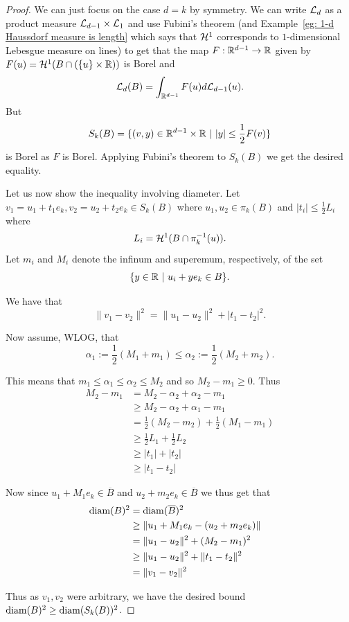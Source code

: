 \documentclass[twoside, a4paper, 10pt]{amsart}
\begin{document}
\begin{proof} We can just focus on the case $d=k$ by symmetry. We can write $\mathcal{L}_d$ as a product measure $\mathcal{L}_{d-1} \times \mathcal{L}_1$ and use Fubini's theorem (and Example~\ref{eg: 1-d Haussdorf measure is length} which says that $\mathcal{H}^1$ corresponds to $1$-dimensional Lebesgue measure on lines) to get that the map $F:\mathbb{R}^{d-1} \to \mathbb{R}$ given by $F(u) = \mathcal{H}^1(B \cap (\{u\} \times \mathbb{R}))$ is Borel and $$\mathcal{L}_d(B) = \int_{\mathbb{R}^{d-1}} F(u) d\mathcal{L}_{d-1}(u).$$ But $$S_k(B) = \{ (v, y) \in \mathbb{R}^{d-1} \times \mathbb{R} ~|~ |y| \leq \frac{1}{2} F(v) \}$$ is Borel as $F$ is Borel. Applying Fubini's theorem to $S_k(B)$ we get the desired equality.

Let us now show the inequality involving diameter. Let $v_1 = u_1 + t_1e_k, v_2 = u_2+t_2e_k \in S_k(B)$ where $u_1, u_2 \in \pi_k(B)$ and $|t_i| \leq \frac{1}{2}L_i$ where $$L_i = \mathcal{H}^{1}(B \cap \pi_k^{-1}(u)).$$ Let $m_i$ and $M_i$ denote the infinum and superemum, respectively, of the set $$\{ y \in \mathbb{R} ~|~ u_i + ye_k \in B\}.$$

We have that
$$\|v_1 - v_2\|^2 = \|u_1 - u_2\|^2 + |t_1 - t_2|^2.$$

Now assume, WLOG, that $$\alpha_1 := \frac{1}{2} (M_1+m_1) \leq \alpha_2 := \frac{1}{2}(M_2 + m_2).$$

This means that $m_1 \leq \alpha_1 \leq \alpha_2 \leq M_2$ and so $M_2 - m_1 \geq 0$. Thus 
\begin{align*}
M_2 - m_1 &= M_2 - \alpha_2 + \alpha_2 - m_1  \\
&\geq M_2 - \alpha_2 + \alpha_1 - m_1 \\
&= \frac{1}{2}(M_2 - m_2) + \frac{1}{2}(M_1 - m_1) \\
&\geq \frac{1}{2}L_1 + \frac{1}{2}L_2 \\
&\geq |t_1| + |t_2| \\
&\geq |t_1 - t_2|
\end{align*}

Now since $u_1 + M_1e_k \in \overline{B}$ and $u_2 + m_2e_k \in \overline{B}$ we thus get that
\begin{align*} 
\operatorname{diam}(B)^2 &= \operatorname{diam}(\overline{B})^2 & \\
&\geq \|u_1 + M_1e_k - (u_2 + m_2e_k) \| \\
&= \|u_1 - u_2\|^2 + (M_2 - m_1)^2 \\
&\geq \|u_1 - u_2\|^2 + \|t_1 - t_2\|^2 \\
& = \|v_1 - v_2\|^2 \end{align*}

Thus as $v_1,v_2$ were arbitrary, we have the desired bound $\operatorname{diam}(B)^2 \geq \operatorname{diam}(S_k(B))^2$. \end{proof}
\end{document}
